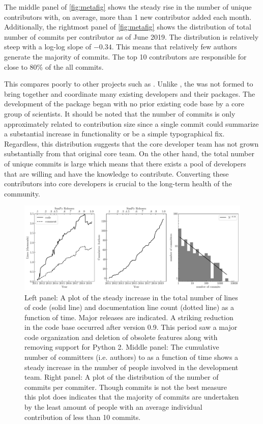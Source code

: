 The middle panel of \autoref{fig:metafig} shows the steady rise in the number of unique contributors with, on average, more than 1 new contributor added each month.
Additionally, the rightmost panel of \autoref{fig:metafig} shows the distribution of total number of commits per contributor as of June 2019.
The distribution is relatively steep with a log-log slope of $-0.34$.
This means that relatively few authors generate the majority of commits.
The top 10 contributors are responsible for close to 80\% of the all commits.

This compares poorly to other projects such as \astropy \citep{astropy2018}.
Unlike \astropy, the \sunpyproj was not formed to bring together and coordinate many existing developers and their \python packages.
The development of the \sunpypkg package began with no prior existing code base by a core group of scientists.
It should be noted that the number of commits is only approximately related to contribution size since a single commit could summarize a substantial increase in functionality or be a simple typographical fix.
Regardless, this distribution suggests that the core developer team has not grown substantially from that original core team.
On the other hand, the total number of unique commits is large which means that there exists a pool of \sunpypkg developers that are willing and have the knowledge to contribute.
Converting these contributors into core developers is crucial to the long-term health of the community.


\begin{figure}
    \center
    \includegraphics[width = 1.0\textwidth]{figures/dev_meta.pdf}
    \caption{Left panel: A plot of the steady increase in the total number of lines of code (solid line) and documentation line count (dotted line) as a function of time.
	Major releases are indicated.
	A striking reduction in the code base occurred after version 0.9.
	This period saw a major code organization and deletion of obsolete features along with removing support for Python 2.
	Middle panel: The cumulative number of committers (i.e. authors) to \sunpypkg as a function of time shows a steady increase in the number of people involved in the development team.
	Right panel: A plot of the distribution of the number of commits per commiter.
	Though commits is not the best measure this plot does indicates that the majority of commits are undertaken by the least amount of people with an average individual contribution of less than 10 commits.}
\label{fig:metafig}
\end{figure}
